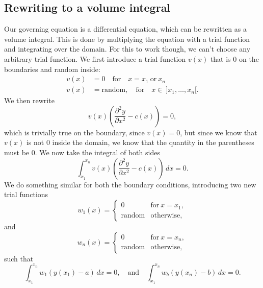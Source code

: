 \documentclass[acmtog]{acmart}
\begin{document}
\subsection{Rewriting to a volume integral}
Our governing equation is a differential equation, which can be
rewritten as a volume integral. This is done by
multiplying the equation with a trial function and integrating over the domain.
For this to work though, we can't choose any arbitrary trial function. We first introduce a trial function $v(x)$ that is 0 on the boundaries and
random inside:
%
\begin{align}
  v(x) & = 0 \quad \text{for} \quad x = x_1 \ \text{or} \ x_n                 \\
  v(x) & = \mathrm{random}, \quad \text{for} \quad x \in \ ]x_1, \dots, x_n[.
\end{align}
%
We then rewrite
%
\begin{equation}
  v(x) \left( \frac{ \partial^{2} y }{ \partial x^{2} }  - c(x) \right) = 0,
\end{equation}
which is trivially true on the boundary, since $v(x) = 0$, but since we know that $v(x)$ is not 0 inside the domain, we know that the quantity in the parentheses must be $0$.
%
We now take the integral of both sides
%
\begin{equation}
  \int_{x_1}^{x_n} v(x) \left( \frac{\partial^{2} y }{ \partial x^{2} } - c(x) \right) \, dx = 0.
\end{equation}
%
We do something similar for both the boundary conditions, introducing two new
trial functions
%
\begin{equation}
  w_1(x) = \begin{cases}
    0               & \text{for} \ x = x_1, \\
    \mathrm{random} & \text{otherwise},
  \end{cases}
\end{equation}
%
and
%
\begin{equation}
  w_n(x) = \begin{cases}
    0               & \text{for} \ x = x_n, \\
    \mathrm{random} & \text{otherwise},
  \end{cases}
\end{equation}
%
such that
%
\begin{equation}
  \int_{x_1}^{x_n} w_1 \left( y(x_1) - a \right) \, dx = 0, \quad \mathrm{and} \quad \int_{x_1}^{x_n} w_b \left( y(x_n) - b \right) \, dx = 0.
\end{equation}
\end{document}
